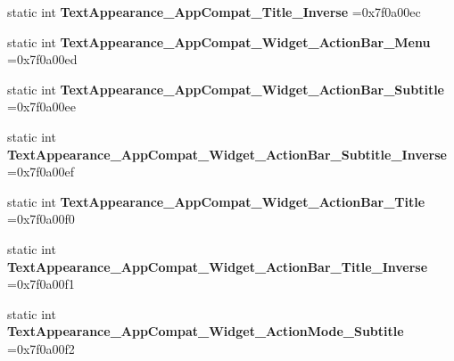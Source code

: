 \begin{DoxyCompactItemize}
static int {\bfseries Text\+Appearance\+\_\+\+App\+Compat\+\_\+\+Title\+\_\+\+Inverse} =0x7f0a00ec
\item 
\mbox{\label{classandroid_1_1support_1_1graphics_1_1drawable_1_1animated_1_1R_1_1style_ad6bad4baf78f1fc8ec45eb0c775c8278}} 
static int {\bfseries Text\+Appearance\+\_\+\+App\+Compat\+\_\+\+Widget\+\_\+\+Action\+Bar\+\_\+\+Menu} =0x7f0a00ed
\item 
\mbox{\label{classandroid_1_1support_1_1graphics_1_1drawable_1_1animated_1_1R_1_1style_a898a70351c8775b2abaf041a7342065f}} 
static int {\bfseries Text\+Appearance\+\_\+\+App\+Compat\+\_\+\+Widget\+\_\+\+Action\+Bar\+\_\+\+Subtitle} =0x7f0a00ee
\item 
\mbox{\label{classandroid_1_1support_1_1graphics_1_1drawable_1_1animated_1_1R_1_1style_a03cefccfc45ae01114b9c825d91a7d88}} 
static int {\bfseries Text\+Appearance\+\_\+\+App\+Compat\+\_\+\+Widget\+\_\+\+Action\+Bar\+\_\+\+Subtitle\+\_\+\+Inverse} =0x7f0a00ef
\item 
\mbox{\label{classandroid_1_1support_1_1graphics_1_1drawable_1_1animated_1_1R_1_1style_ac016df19bcb17c489b541f18dd4dd91f}} 
static int {\bfseries Text\+Appearance\+\_\+\+App\+Compat\+\_\+\+Widget\+\_\+\+Action\+Bar\+\_\+\+Title} =0x7f0a00f0
\item 
\mbox{\label{classandroid_1_1support_1_1graphics_1_1drawable_1_1animated_1_1R_1_1style_a8efe994ad2a6c1f385cfbcbc76aa41e9}} 
static int {\bfseries Text\+Appearance\+\_\+\+App\+Compat\+\_\+\+Widget\+\_\+\+Action\+Bar\+\_\+\+Title\+\_\+\+Inverse} =0x7f0a00f1
\item 
\mbox{\label{classandroid_1_1support_1_1graphics_1_1drawable_1_1animated_1_1R_1_1style_acb40b0905c20d0e9789819a4231ab53e}} 
static int {\bfseries Text\+Appearance\+\_\+\+App\+Compat\+\_\+\+Widget\+\_\+\+Action\+Mode\+\_\+\+Subtitle} =0x7f0a00f2
\item 

\end{DoxyCompactItemize}
